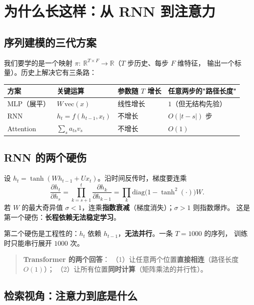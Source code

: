 \chapter{为什么长这样：从 RNN 到注意力}
\section{序列建模的三代方案}

我们要学的是一个映射 $\pi:\ \mathbb{R}^{T\times F}\to\mathbb{R}$（$T$ 步历史、每步 $F$ 维特征，
输出一个标量）。历史上解决它有三条路：

\begin{center}
\small
\begin{tabular}{@{}llll@{}}
\toprule
方案 & 关键运算 & 参数随 $T$ 增长 & 任意两步的"路径长度" \\
\midrule
MLP（展平） & $W\,\mathrm{vec}(x)$ & 线性增长 & $1$（但无结构先验）\\
RNN & $h_t=f(h_{t-1},x_t)$ & 不增长 & $O(|t-s|)$ 步 \\
Attention & $\sum_s a_{ts}v_s$ & 不增长 & $O(1)$ \\
\bottomrule
\end{tabular}
\end{center}

\section{RNN 的两个硬伤}

设 $h_t=\tanh(Wh_{t-1}+Ux_t)$。沿时间反传时，梯度要连乘
\begin{equation}
  \frac{\partial h_t}{\partial h_s}=\prod_{k=s+1}^{t}\frac{\partial h_k}{\partial h_{k-1}}
  =\prod_{k}\mathrm{diag}\big(1-\tanh^2(\cdot)\big)W .
\end{equation}
若 $W$ 的最大奇异值 $\sigma<1$，连乘\textbf{指数衰减}（梯度消失）；$\sigma>1$ 则指数爆炸。
这是第一个硬伤：\textbf{长程依赖无法稳定学习}。

第二个硬伤是工程性的：$h_t$ 依赖 $h_{t-1}$，\textbf{无法并行}。一条 $T=1000$ 的序列，
训练时只能串行展开 $1000$ 次。

\begin{quote}
\textbf{Transformer 的两个回答}：
（1）让任意两个位置\textbf{直接相连}（路径长度 $O(1)$）；
（2）让所有位置\textbf{同时计算}（矩阵乘法的并行性）。
\end{quote}

\section{检索视角：注意力到底是什么}


